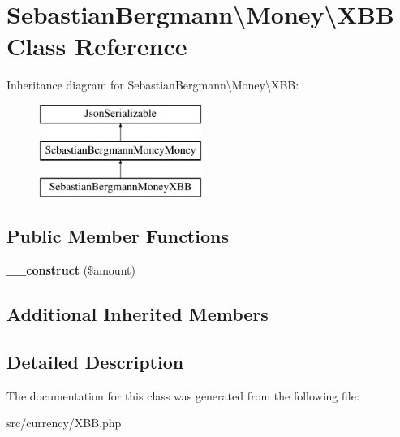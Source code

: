 \hypertarget{classSebastianBergmann_1_1Money_1_1XBB}{}\section{Sebastian\+Bergmann\textbackslash{}Money\textbackslash{}X\+B\+B Class Reference}
\label{classSebastianBergmann_1_1Money_1_1XBB}
Inheritance diagram for Sebastian\+Bergmann\textbackslash{}Money\textbackslash{}X\+B\+B\+:\begin{figure}[H]
\begin{center}
\leavevmode
\includegraphics[height=3.000000cm]{classSebastianBergmann_1_1Money_1_1XBB}
\end{center}
\end{figure}
\subsection*{Public Member Functions}
\begin{DoxyCompactItemize}
\item 
\hypertarget{classSebastianBergmann_1_1Money_1_1XBB_a0e724a3d1c75d413749c146dceb52ad8}{}{\bfseries \+\_\+\+\_\+construct} (\$amount)\label{classSebastianBergmann_1_1Money_1_1XBB_a0e724a3d1c75d413749c146dceb52ad8}

\end{DoxyCompactItemize}
\subsection*{Additional Inherited Members}


\subsection{Detailed Description}


The documentation for this class was generated from the following file\+:\begin{DoxyCompactItemize}
\item 
src/currency/X\+B\+B.\+php\end{DoxyCompactItemize}
